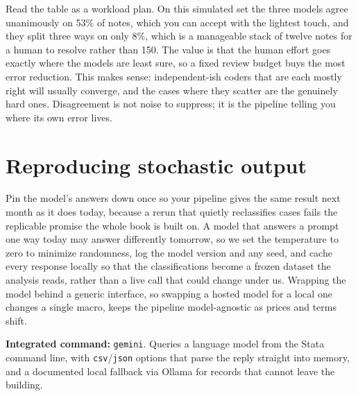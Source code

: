 \documentclass[
    a4paper,
    fontsize=10pt,
    twoside=true,
    numbers=noenddot,
]{kaobook}
\begin{document}
\medskip
Read the table as a workload plan. On this simulated set the three models agree unanimously on 53\% of notes, which you can accept with the lightest touch, and they split three ways on only 8\%, which is a manageable stack of twelve notes for a human to resolve rather than 150. The value is that the human effort goes exactly where the models are least sure, so a fixed review budget buys the most error reduction. This makes sense: independent-ish coders that are each mostly right will usually converge, and the cases where they scatter are the genuinely hard ones. Disagreement is not noise to suppress; it is the pipeline telling you where its own error lives.

\section{Reproducing stochastic output}
Pin the model's answers down once so your pipeline gives the same result next month as it does today, because a rerun that quietly reclassifies cases fails the replicable promise the whole book is built on. A model that answers a prompt one way today may answer differently tomorrow, so we set the temperature to zero to minimize randomness, log the model version and any seed, and cache every response locally so that the classifications become a frozen dataset the analysis reads, rather than a live call that could change under us. Wrapping the model behind a generic interface, so swapping a hosted model for a local one changes a single macro, keeps the pipeline model-agnostic as prices and terms shift.

\begin{kaobox}[frametitle=Package Integration: \texttt{gemini}]
\textbf{Integrated command:} \texttt{gemini}. Queries a language model from the Stata command line, with \texttt{csv}/\texttt{json} options that parse the reply straight into memory, and a documented local fallback via Ollama for records that cannot leave the building.
\end{kaobox}
\end{document}
